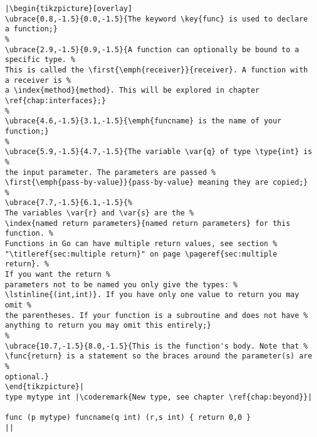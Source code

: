\begin{lstlisting}[caption=A function declaration,label=src:function definition]
|\begin{tikzpicture}[overlay]
\ubrace{0.8,-1.5}{0.0,-1.5}{The keyword \key{func} is used to declare a function;}
%
\ubrace{2.9,-1.5}{0.9,-1.5}{A function can optionally be bound to a specific type. %
This is called the \first{\emph{receiver}}{receiver}. A function with a receiver is %
a \index{method}{method}. This will be explored in chapter \ref{chap:interfaces};}
%
\ubrace{4.6,-1.5}{3.1,-1.5}{\emph{funcname} is the name of your function;}
%
\ubrace{5.9,-1.5}{4.7,-1.5}{The variable \var{q} of type \type{int} is %
the input parameter. The parameters are passed %
\first{\emph{pass-by-value}}{pass-by-value} meaning they are copied;}
%
\ubrace{7.7,-1.5}{6.1,-1.5}{%
The variables \var{r} and \var{s} are the %
\index{named return parameters}{named return parameters} for this function. %
Functions in Go can have multiple return values, see section %
"\titleref{sec:multiple return}" on page \pageref{sec:multiple return}. %
If you want the return %
parameters not to be named you only give the types: %
\lstinline{(int,int)}. If you have only one value to return you may omit %
the parentheses. If your function is a subroutine and does not have %
anything to return you may omit this entirely;}
%
\ubrace{10.7,-1.5}{8.0,-1.5}{This is the function's body. Note that %
\func{return} is a statement so the braces around the parameter(s) are %
optional.}
\end{tikzpicture}|
type mytype int	|\coderemark{New type, see chapter \ref{chap:beyond}}|

func (p mytype) funcname(q int) (r,s int) { return 0,0 }
||
\end{lstlisting}
